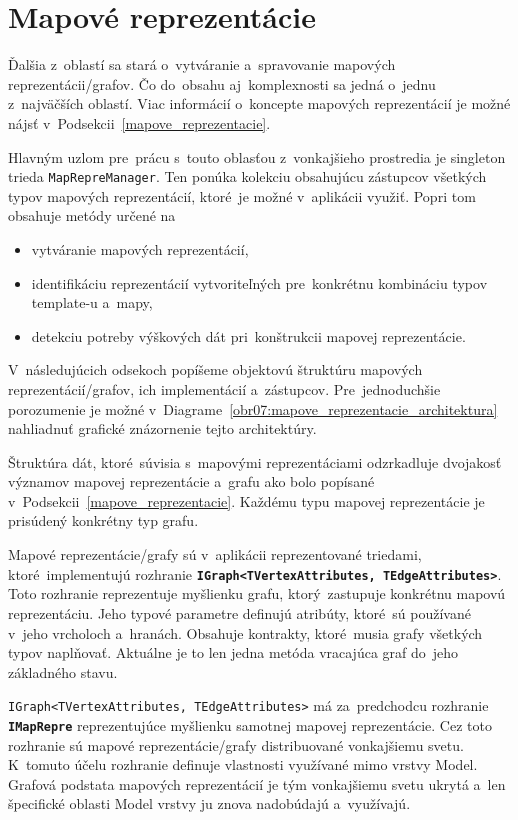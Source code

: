 \section{Mapové reprezentácie}

Ďalšia z~oblastí sa stará o~vytváranie a~spravovanie mapových reprezentácii/grafov. Čo do~obsahu aj~komplexnosti sa jedná o~jednu z~najväčších oblastí. Viac informácií o~koncepte mapových reprezentácií je možné nájsť v~Podsekcii~\ref{mapove_reprezentacie}.

Hlavným uzlom pre~prácu s~touto oblasťou z~vonkajšieho prostredia je singleton trieda \texttt{MapRepreManager}. Ten ponúka kolekciu obsahujúcu zástupcov všetkých typov mapových reprezentácií, ktoré~je možné v~aplikácii využiť. Popri tom obsahuje metódy určené na~
\begin{itemize}
    \item vytváranie mapových reprezentácií,
    \item identifikáciu reprezentácií vytvoriteľných pre~konkrétnu kombináciu typov template-u a~mapy,
    \item detekciu potreby výškových dát pri~konštrukcii mapovej reprezentácie.
\end{itemize}

V~následujúcich odsekoch popíšeme objektovú štruktúru mapových reprezentácií/grafov, ich implementácií a~zástupcov. Pre~jednoduchšie porozumenie je možné v~Diagrame~\ref{obr07:mapove_reprezentacie_architektura} nahliadnuť grafické znázornenie tejto architektúry. 

\bigskip

Štruktúra dát, ktoré~súvisia s~mapovými reprezentáciami odzrkadluje dvojakosť významov mapovej reprezentácie a~grafu ako bolo popísané v~Podsekcii~\ref{mapove_reprezentacie}. Každému typu mapovej reprezentácie je prisúdený konkrétny typ grafu.

Mapové reprezentácie/grafy sú v~aplikácii reprezentované triedami, ktoré~implementujú rozhranie \textbf{\texttt{IGraph<TVertexAttributes, TEdgeAttributes>}}. Toto rozhranie reprezentuje myšlienku grafu, ktorý~zastupuje konkrétnu mapovú reprezentáciu. Jeho typové parametre definujú atribúty, ktoré~sú používané v~jeho vrcholoch a~hranách. Obsahuje kontrakty, ktoré~musia grafy všetkých typov naplňovať. Aktuálne je to len jedna metóda vracajúca graf do~jeho základného stavu.

\texttt{IGraph<TVertexAttributes, TEdgeAttributes>} má za~predchodcu rozhranie \textbf{\texttt{IMapRepre}} reprezentujúce myšlienku samotnej mapovej reprezentácie. Cez toto rozhranie sú mapové reprezentácie/grafy distribuované vonkajšiemu svetu. K~tomuto účelu rozhranie definuje vlastnosti využívané mimo vrstvy Model. Grafová podstata mapových reprezentácií je tým vonkajšiemu svetu ukrytá a~len špecifické oblasti Model vrstvy ju znova nadobúdajú a~využívajú.

